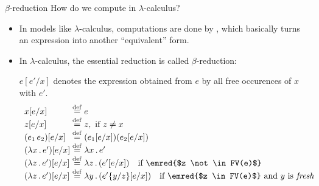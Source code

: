 \documentclass[paper=screen,mode=present,style=zysimple]{powerdot}
\begin{document}
\begin{slide}{$\beta$-reduction}
How do we compute in $\lambda$-calculus?
\begin{itemize}
\item In models like $\lambda$-calculus, computations are done by , 
  which basically turns an expression into another ``equivalent'' form. 
\item In $\lambda$-calculus, the essential reduction is called $\beta$-reduction:
\vspace*{-0.5em}
\begin{wrap}
\vspace*{-0.6em}
\end{wrap}
\vspace*{-0.2em}
$e [e' / x]$ denotes the expression obtained from $e$ by  all free occurences 
of $x$ with $e'$. \vspace*{-0.5em}
\[
\begin{array}{l@{\;}l}
x [e / x] & \defeq e \\
z [e / x] & \defeq z,  \mbox{ if } z \neq x \\
(e_1 \, e_2) [e / x] & \defeq (e_1 [e / x]) (e_2 [e / x]) \\
(\lambda x \ldot e') [e / x] & \defeq \lambda x \ldot e' \\
(\lambda z \ldot e') [e / x] & \defeq \lambda z \ldot (e' [e / x]) \quad \mbox{if \emred{$z \not\in FV(e)$}} \\
(\lambda z \ldot e') [e / x] & \defeq \lambda y \ldot (e' \set{y / z} [e / x]) \quad \mbox{if \emred{$z \in FV(e)$} and $y $ is {\em fresh}} \\
\end{array}
\]
\end{itemize}
\end{slide}
\end{document}
